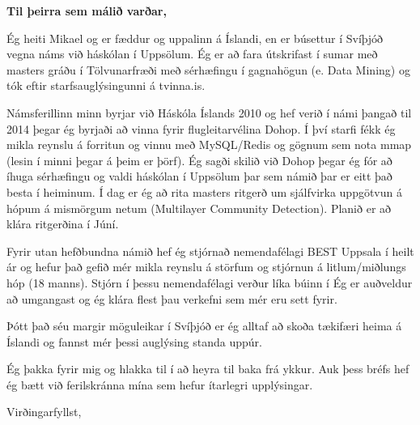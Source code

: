 \documentclass{letter}
\begin{document}

\begin{letter}{ } %


\opening{\textbf{Til þeirra sem málið varðar,}}

Ég heiti Mikael og er fæddur og uppalinn á Íslandi, en er búsettur í Svíþjóð vegna náms við háskólan í Uppsölum. Ég er að fara útskrifast í sumar með masters gráðu í Tölvunarfræði með sérhæfingu í gagnahögun (e. Data Mining) og tók eftir starfsauglýsingunni á tvinna.is.

Námsferillinn minn byrjar við Háskóla Íslands 2010 og hef verið í námi þangað til 2014 þegar ég byrjaði að vinna fyrir flugleitarvélina Dohop. Í því starfi fékk ég mikla reynslu á forritun og vinnu með MySQL/Redis og gögnum sem nota mmap (lesin í minni þegar á þeim er þörf). Ég sagði skilið við Dohop þegar ég fór að íhuga sérhæfingu og valdi háskólan í Uppsölum þar sem námið þar er eitt það besta í heiminum. Í dag er ég að rita masters ritgerð um sjálfvirka uppgötvun á hópum á mismörgum netum (Multilayer Community Detection). Planið er að klára ritgerðina í Júní.

Fyrir utan hefðbundna námið hef ég stjórnað nemendafélagi BEST Uppsala í heilt ár og hefur það gefið mér mikla reynslu á störfum og stjórnun á litlum/miðlungs hóp (18 manns). Stjórn í þessu nemendafélagi verður líka búinn í Ég er auðveldur að umgangast og ég klára flest þau verkefni sem mér eru sett fyrir.

Þótt það séu margir möguleikar í Svíþjóð er ég alltaf að skoða tækifæri heima á Íslandi og fannst mér þessi auglýsing standa uppúr.

Ég þakka fyrir mig og hlakka til í að heyra til baka frá ykkur. Auk þess bréfs hef ég bætt við ferilskránna mína sem hefur ítarlegri upplýsingar.

\vspace{2\parskip} %
\closing{Virðingarfyllst,}
\vspace{2\parskip} %

\end{letter}
\end{document}
